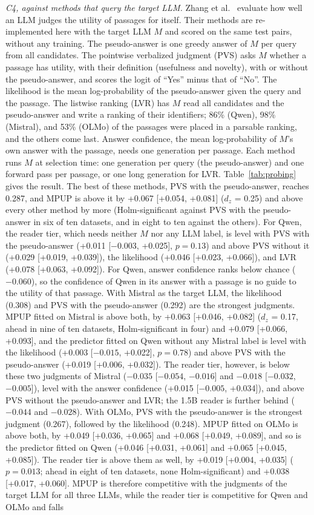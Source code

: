 \documentclass[conference]{IEEEtran}
\begin{document}
\textit{C4, against methods that query the target LLM.} Zhang et al.~\cite{zhang2025c} evaluate how well an LLM judges the utility of passages for itself. Their methods are re-implemented here with the target LLM $M$ and scored on the same test pairs, without any training. The pseudo-answer is one greedy answer of $M$ per query from all candidates. The pointwise verbalized judgment (PVS) asks $M$ whether a passage has utility, with their definition (usefulness and novelty), with or without the pseudo-answer, and scores the logit of ``Yes'' minus that of ``No''. The likelihood is the mean log-probability of the pseudo-answer given the query and the passage. The listwise ranking (LVR) has $M$ read all candidates and the pseudo-answer and write a ranking of their identifiers; 86\% (Qwen), 98\% (Mistral), and 53\% (OLMo) of the passages were placed in a parsable ranking, and the others come last. Answer confidence, the mean log-probability of $M$'s own answer with the passage, needs one generation per passage. Each method runs $M$ at selection time: one generation per query (the pseudo-answer) and one forward pass per passage, or one long generation for LVR. Table~\ref{tab:probing} gives the result. The best of these methods, PVS with the pseudo-answer, reaches 0.287, and MPUP is above it by +0.067 [+0.054, +0.081] ($d_z$ = 0.25) and above every other method by more (Holm-significant against PVS with the pseudo-answer in six of ten datasets, and in eight to ten against the others). For Qwen, the reader tier, which needs neither $M$ nor any LLM label, is level with PVS with the pseudo-answer (+0.011 [$-0.003$, +0.025], $p = 0.13$) and above PVS without it (+0.029 [+0.019, +0.039]), the likelihood (+0.046 [+0.023, +0.066]), and LVR (+0.078 [+0.063, +0.092]). For Qwen, answer confidence ranks below chance ($-0.060$), so the confidence of Qwen in its answer with a passage is no guide to the utility of that passage. With Mistral as the target LLM, the likelihood (0.308) and PVS with the pseudo-answer (0.292) are the strongest judgments. MPUP fitted on Mistral is above both, by +0.063 [+0.046, +0.082] ($d_z$ = 0.17, ahead in nine of ten datasets, Holm-significant in four) and +0.079 [+0.066, +0.093], and the predictor fitted on Qwen without any Mistral label is level with the likelihood (+0.003 [$-0.015$, +0.022], $p = 0.78$) and above PVS with the pseudo-answer (+0.019 [+0.006, +0.032]). The reader tier, however, is below these two judgments of Mistral ($-0.035$ [$-0.054$, $-0.016$] and $-0.018$ [$-0.032$, $-0.005$]), level with the answer confidence (+0.015 [$-0.005$, +0.034]), and above PVS without the pseudo-answer and LVR; the 1.5B reader is further behind ($-0.044$ and $-0.028$). With OLMo, PVS with the pseudo-answer is the strongest judgment (0.267), followed by the likelihood (0.248). MPUP fitted on OLMo is above both, by +0.049 [+0.036, +0.065] and +0.068 [+0.049, +0.089], and so is the predictor fitted on Qwen (+0.046 [+0.031, +0.061] and +0.065 [+0.045, +0.085]). The reader tier is above them as well, by +0.019 [+0.004, +0.035] ($p = 0.013$; ahead in eight of ten datasets, none Holm-significant) and +0.038 [+0.017, +0.060]. MPUP is therefore competitive with the judgments of the target LLM for all three LLMs, while the reader tier is competitive for Qwen and OLMo and falls 
\end{document}
